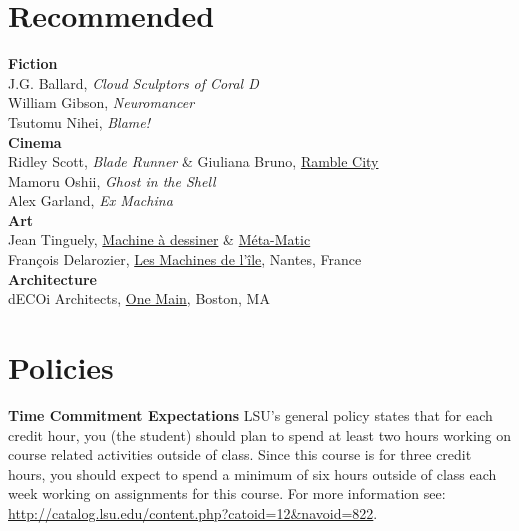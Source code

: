 \documentclass[11pt,article,oneside]{memoir}
\begin{document}
\section{Recommended}

\noindent \textbf{Fiction}\\
J.G. Ballard, \emph{Cloud Sculptors of Coral D}\\
William Gibson, \emph{Neuromancer}\\
Tsutomu Nihei, \emph{Blame!}\\

\noindent \textbf{Cinema}\\
Ridley Scott, \emph{Blade Runner}
\& Giuliana Bruno, \href{www.jstor.org/stable/778330}{Ramble City}\\
Mamoru Oshii, \emph{Ghost in the Shell}\\
Alex Garland, \emph{Ex Machina}\\

\noindent \textbf{Art}\\
Jean Tinguely, \href{https://www.tinguely.ch/en/sammlung/sammlung.html}{Machine \`{a} dessiner}
\& \href{https://www.tinguely.ch/en/sammlung/sammlung.html}{M\'{e}ta-Matic}\\
François Delarozier, \href{https://www.lesmachines-nantes.fr/en/}{Les Machines de l’\^{i}le}, Nantes, France\\

\noindent \textbf{Architecture}\\
dECOi Architects, \href{http://www.decoi-architects.org/2011/10/onemain/}{One Main}, Boston, MA\\

\clearpage

\section{Policies}

\noindent \textbf{Time Commitment Expectations}
LSU's general policy states that for each credit hour, you (the student) should plan to
spend at least two hours working on course related activities outside of class. Since this course is for three credit hours, you should expect to spend a minimum of six hours outside of class each week working on assignments for this course. For more information see: 
\url{http://catalog.lsu.edu/content.php?catoid=12&navoid=822}.\\
\end{document}
